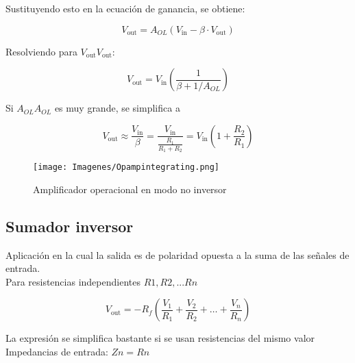 \documentclass{article}
\begin{document}
Sustituyendo esto en la ecuación de ganancia, se obtiene:


\begin{equation}
{\displaystyle V_{\text{out}}=A_{OL}(V_{\text{in}}-\beta \cdot V_{\text{out}})}
\end{equation}


Resolviendo para ${\displaystyle V_{\text{out}}} {\displaystyle V_{\text{out}}}:$

\begin{equation}
{\displaystyle V_{\text{out}}=V_{\text{in}}\left({\frac {1}{\beta +1/A_{OL}}}\right)} 
\end{equation}


Si ${\displaystyle A_{OL}} {\displaystyle A_{OL}}$ es muy grande, se simplifica a



\begin{equation}
{\displaystyle V_{\text{out}}\approx {\frac {V_{\text{in}}}{\beta }}={\frac {V_{\text{in}}}{\frac {R_{\text{1}}}{R_{\text{1}}+R_{\text{2}}}}}=V_{\text{in}}\left(1+{\frac {R_{2}}{R_{1}}}\right)}
\end{equation}

\begin{figure}[h!]
    \centering
    \texttt{[image: Imagenes/Opampintegrating.png]}
    \caption{Amplificador operacional en modo no inversor\citep{AmplificadorOperacional}}
    \label{fig:OpAmpInvert}
\end{figure}

\subsection{Sumador inversor}

Aplicación en la cual la salida es de polaridad opuesta a la suma de las señales de entrada.\citep{AmplificadorOperacional}\\

Para resistencias independientes $R1, R2,... Rn
$

\begin{equation}
{\displaystyle V_{\mathrm {out} }=-R_{f}\left({\frac {V_{1}}{R_{1}}}+{\frac {V_{2}}{R_{2}}}+\dots +{\frac {V_{n}}{R_{n}}}\right)}
\end{equation}

La expresión se simplifica bastante si se usan resistencias del mismo valor
Impedancias de entrada: $Zn = Rn$\citep{AmplificadorOperacional}\\
\end{document}
